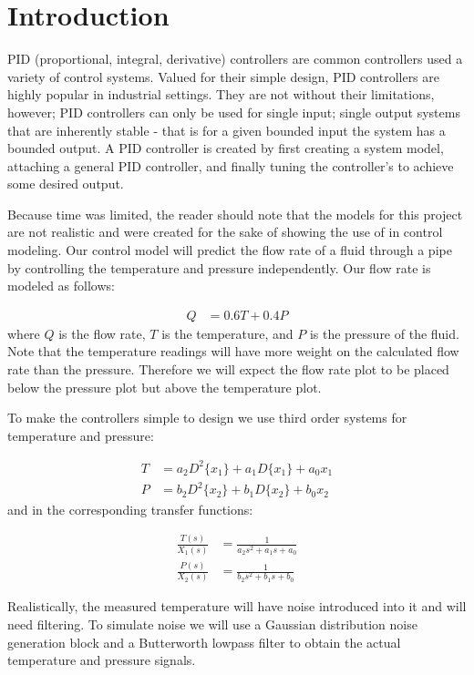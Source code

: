 \documentclass[main.tex]{subfile}
\begin{document}
\section{Introduction} 
\label{sec:introduction}

PID (proportional, integral, derivative) controllers are common controllers used
a variety of control systems. Valued for their simple design, PID controllers 
are highly popular in industrial settings. They are not without their limitations, 
however; PID controllers can only be used for single input; single
output systems that are inherently stable - that is for a given bounded input the
system has a bounded output. A PID controller is created by first creating a
system model, attaching a general PID controller, and finally tuning the
controller's to achieve some desired output. 

Because time was limited, the reader should note that the models for this
project are not realistic and were created for the sake of showing the use of
\Labview in control modeling. Our control model will predict the flow rate of a
fluid through a pipe by controlling the temperature and pressure independently.
Our flow rate is modeled as follows: 

\begin{align}
	Q &= 0.6T+0.4P \label{eq:flowRate}
\end{align}
where $Q$ is the flow rate, $T$ is the temperature, and $P$ is the pressure of
the fluid. Note that the temperature readings will have more weight on the
calculated flow rate than the pressure. Therefore we will expect the flow rate
plot to be placed below the pressure plot but above the temperature plot.

To make the controllers simple to design we use third order systems for
temperature and pressure:

\begin{align}
	T &= a_2D^2\{x_1\} + a_1D\{x_1\} + a_0x_1 \label{eq:plantModel}
	\\P &= b_2D^2\{x_2\} + b_1D\{x_2\} + b_0x_2
\end{align}
and in the corresponding transfer functions:

\begin{align}
	\frac{T(s)}{X_1(s)} &= \frac{1}{a_2s^2+a_1s+a_0}
	\\\frac{P(s)}{X_2(s)} &= \frac{1}{b_2s^2+b_1s+b_0}
\end{align}

Realistically, the measured temperature will have noise introduced into it and
will need filtering. To simulate noise we will use a Gaussian distribution
noise generation block and a Butterworth lowpass filter to obtain the actual
temperature and pressure signals.


\end{document}
